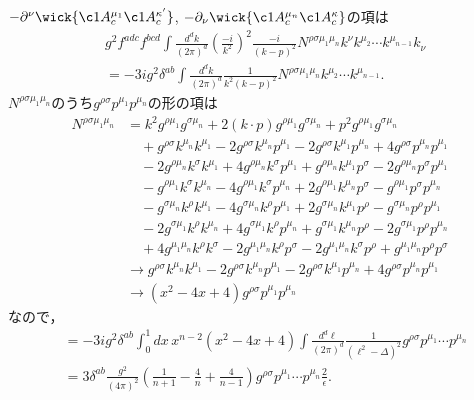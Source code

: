 $-\partial^\nu \wick{\c1{A}^{\mu_1}_c \c1{A}_c^{\kappa'}}$, $-\partial_\nu \wick{\c1{A}^{\mu_n}_c \c1{A}_c^\kappa}$の項は
\begin{align*}
  & g^2 f^{adc} f^{bcd}
  \int \frac{d^dk}{(2\pi)^d} \left( \frac{-i}{k^2} \right)^2 \frac{-i}{(k-p)^2}
  N^{\rho\sigma\mu_1\mu_n} k^\nu k^{\mu_2} \cdots k^{\mu_{n-1}} k_\nu \\
  &= -3 ig^2 \delta^{ab} \int \frac{d^dk}{(2\pi)^d} \frac{1}{k^2(k-p)^2} N^{\rho\sigma\mu_1\mu_n} k^{\mu_2} \cdots k^{\mu_{n-1}} .
\end{align*}
$N^{\rho\sigma\mu_1\mu_n}$のうち$g^{\rho\sigma}p^{\mu_1}p^{\mu_n}$の形の項は
\begin{align*}
  N^{\rho\sigma\mu_1\mu_n}
  &= k^2 g^{\rho\mu_1} g^{\sigma\mu_n} + 2 (k\cdot p) g^{\rho\mu_1} g^{\sigma\mu_n} + p^2 g^{\rho\mu_1} g^{\sigma\mu_n} \\
  &\quad + g^{\rho\sigma} k^{\mu_n} k^{\mu_1} - 2 g^{\rho\sigma} k^{\mu_n} p^{\mu_1}
  - 2 g^{\rho\sigma} k^{\mu_1} p^{\mu_n} + 4 g^{\rho\sigma} p^{\mu_n} p^{\mu_1} \\
  &\quad - 2 g^{\rho\mu_n} k^{\sigma} k^{\mu_1} + 4 g^{\rho\mu_n} k^{\sigma} p^{\mu_1}
  + g^{\rho\mu_n} k^{\mu_1} p^{\sigma} - 2 g^{\rho\mu_n} p^{\sigma} p^{\mu_1} \\
  &\quad - g^{\rho\mu_1} k^{\sigma} k^{\mu_n} - 4 g^{\rho\mu_1} k^{\sigma} p^{\mu_n}
  + 2 g^{\rho\mu_1} k^{\mu_n} p^{\sigma} - g^{\rho\mu_1} p^{\sigma} p^{\mu_n} \\
  &\quad - g^{\sigma\mu_n} k^{\rho} k^{\mu_1} - 4 g^{\sigma\mu_n} k^{\rho} p^{\mu_1}
   + 2 g^{\sigma\mu_n} k^{\mu_1} p^{\rho} - g^{\sigma\mu_n} p^{\rho} p^{\mu_1} \\
  &\quad - 2 g^{\sigma\mu_1} k^{\rho} k^{\mu_n} + 4 g^{\sigma\mu_1} k^{\rho} p^{\mu_n}
  + g^{\sigma\mu_1} k^{\mu_n} p^{\rho} - 2 g^{\sigma\mu_1} p^{\rho} p^{\mu_n} \\
  &\quad + 4 g^{\mu_1\mu_n} k^{\rho} k^{\sigma} - 2 g^{\mu_1\mu_n} k^{\rho} p^{\sigma}
   - 2 g^{\mu_1\mu_n} k^{\sigma} p^{\rho} + g^{\mu_1\mu_n} p^{\rho} p^{\sigma} \\
  &\to g^{\rho\sigma} k^{\mu_n} k^{\mu_1} - 2 g^{\rho\sigma} k^{\mu_n} p^{\mu_1}
  - 2 g^{\rho\sigma} k^{\mu_1} p^{\mu_n} + 4 g^{\rho\sigma} p^{\mu_n} p^{\mu_1} \\
  &\to (x^2-4x+4) g^{\rho\sigma} p^{\mu_1} p^{\mu_n}
\end{align*}
なので，
\begin{align*}
  &= -3 ig^2 \delta^{ab} \int_0^1 dx \, x^{n-2} (x^2-4x+4) \int \frac{d^d\ell}{(2\pi)^d} \frac{1}{(\ell^2-\Delta)^2} g^{\rho\sigma} p^{\mu_1} \cdots p^{\mu_n} \\
  &= 3 \delta^{ab} \frac{g^2}{(4\pi)^2} \left(\frac{1}{n+1} - \frac{4}{n} + \frac{4}{n-1}\right) g^{\rho\sigma} p^{\mu_1} \cdots p^{\mu_n} \frac{2}{\epsilon} .
\end{align*}

